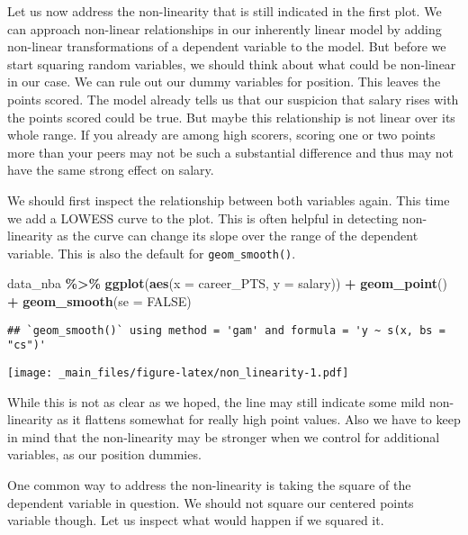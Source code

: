 \documentclass[
]{book}
\newenvironment{Shaded}{\begin{snugshade}}{\end{snugshade}}
\newcommand{\AttributeTok}[1]{\textcolor[rgb]{0.13,0.29,0.53}{#1}}
\newcommand{\ConstantTok}[1]{\textcolor[rgb]{0.56,0.35,0.01}{#1}}
\newcommand{\FunctionTok}[1]{\textcolor[rgb]{0.13,0.29,0.53}{\textbf{#1}}}
\newcommand{\NormalTok}[1]{#1}
\newcommand{\SpecialCharTok}[1]{\textcolor[rgb]{0.81,0.36,0.00}{\textbf{#1}}}
\begin{document}
Let us now address the non-linearity that is still indicated in the first plot.
We can approach non-linear relationships in our inherently linear model by
adding non-linear transformations of a dependent variable to the model. But
before we start squaring random variables, we should think about what could be
non-linear in our case. We can rule out our dummy variables for position. This
leaves the points scored. The model already tells us that our suspicion that
salary rises with the points scored could be true. But maybe this relationship
is not linear over its whole range. If you already are among high scorers,
scoring one or two points more than your peers may not be such a substantial
difference and thus may not have the same strong effect on salary.

We should first inspect the relationship between both variables again. This time
we add a LOWESS curve to the plot. This is often helpful in detecting
non-linearity as the curve can change its slope over the range of the dependent
variable. This is also the default for \texttt{geom\_smooth()}.

\begin{Shaded}
\begin{Highlighting}[]
\NormalTok{data\_nba }\SpecialCharTok{\%\textgreater{}\%} 
  \FunctionTok{ggplot}\NormalTok{(}\FunctionTok{aes}\NormalTok{(}\AttributeTok{x =}\NormalTok{ career\_PTS, }\AttributeTok{y =}\NormalTok{ salary)) }\SpecialCharTok{+}
  \FunctionTok{geom\_point}\NormalTok{() }\SpecialCharTok{+}
  \FunctionTok{geom\_smooth}\NormalTok{(}\AttributeTok{se =} \ConstantTok{FALSE}\NormalTok{)}
\end{Highlighting}
\end{Shaded}

\begin{verbatim}
## `geom_smooth()` using method = 'gam' and formula = 'y ~ s(x, bs = "cs")'
\end{verbatim}

\texttt{[image: \_main\_files/figure-latex/non\_linearity-1.pdf]}

While this is not as clear as we hoped, the line may still indicate some mild
non-linearity as it flattens somewhat for really high point values. Also we have
to keep in mind that the non-linearity may be stronger when we control for
additional variables, as our position dummies.

One common way to address the non-linearity is taking the square of the
dependent variable in question. We should not square our centered points
variable though. Let us inspect what would happen if we squared it.
\end{document}
